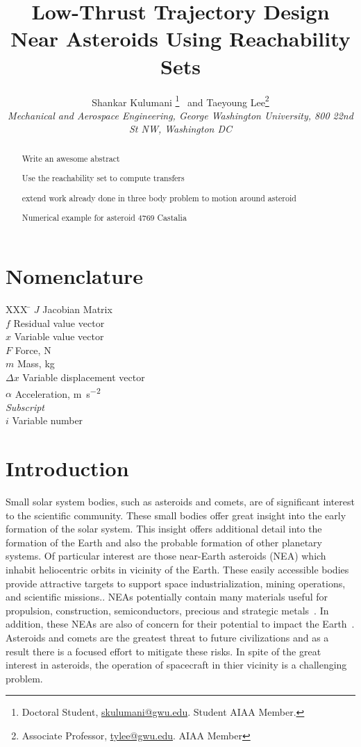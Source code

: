 \documentclass[]{aiaa-tc}%
\title{Low-Thrust Trajectory Design Near Asteroids Using Reachability Sets}
\author{
  Shankar Kulumani\thanksibid{1}%
    \thanks{Doctoral Student, \href{mailto:skulumani@gwu.edu}{skulumani@gwu.edu}. Student AIAA Member.}
  \ and Taeyoung Lee\thanksibid{2}\thanks{Associate Professor, \href{mailto:tylee@gwu.edu}{tylee@gwu.edu}. AIAA Member}\\
  {\normalsize\itshape
   Mechanical and Aerospace Engineering, George Washington University, 800 22nd St NW, Washington DC }\\
   }
\begin{document}
\maketitle

\begin{abstract}
Write an awesome abstract

Use the reachability set to compute transfers

extend work already done in three body problem to motion around asteroid

Numerical example for asteroid 4769 Castalia
\end{abstract}

\section*{Nomenclature}

\begin{tabbing}
  XXX \= \kill%
  $J$ \> Jacobian Matrix \\
  $f$ \> Residual value vector \\
  $x$ \> Variable value vector \\
  $F$ \> Force, \si{\newton} \\
  $m$ \> Mass, \si{\kilo\gram} \\
  $\Delta x$ \> Variable displacement vector \\
  $\alpha$ \> Acceleration, \si{\meter\per\second\squared} \\[5pt]
  \textit{Subscript}\\
  $i$ \> Variable number \\
\end{tabbing}

\section{Introduction}\label{sec:introduction}

Small solar system bodies, such as asteroids and comets, are of significant interest to the scientific community.
These small bodies offer great insight into the early formation of the solar system.
This insight offers additional detail into the formation of the Earth and also the probable formation of other planetary systems.
Of particular interest are those near-Earth asteroids (NEA) which inhabit heliocentric orbits in vicinity of the Earth.
These easily accessible bodies provide attractive targets to support space industrialization, mining operations, and scientific missions..
NEAs potentially contain many materials useful for propulsion, construction, semiconductors, precious and strategic metals~\cite{ross2001}.
In addition, these NEAs are also of concern for their potential to impact the Earth~\cite{wie2008}.
Asteroids and comets are the greatest threat to future civilizations and as a result there is a focused effort to mitigate these risks.
In spite of the great interest in asteroids, the operation of spacecraft in thier vicinity is a challenging problem.
\end{document}
